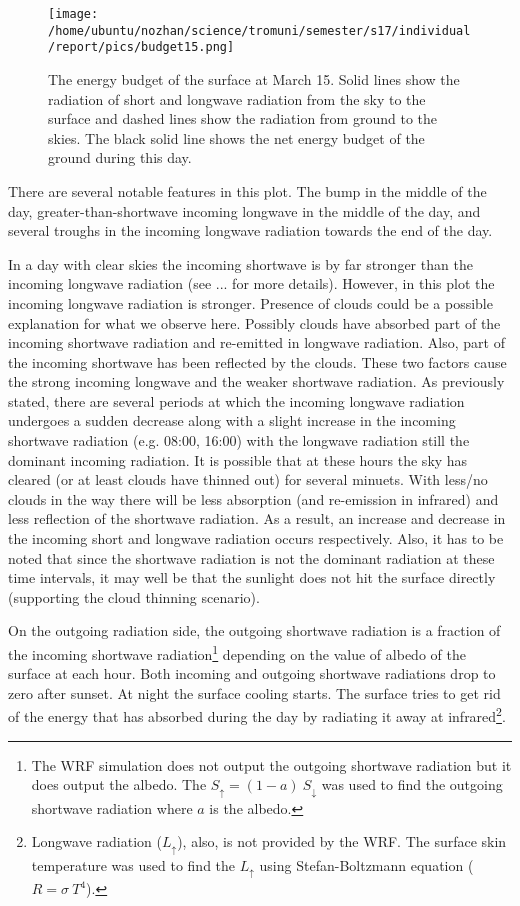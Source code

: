\documentclass[a4paper,12pt]{article}
\numberwithin{equation}{section} %
\begin{document}
\vspace{0.35cm}

\begin{figure}[bhp]
\texttt{[image: /home/ubuntu/nozhan/science/tromuni/semester/s17/individual/report/pics/budget15.png]}
\caption{The energy budget of the surface at March 15. Solid lines show the radiation of short and longwave radiation from the sky to the surface and dashed lines show the radiation from ground to the skies. The black solid line shows the net energy budget of the ground during this day.}
\label{budget15}
\end{figure}

\vspace{1cm}

There are several notable features in this plot. The bump in the middle of the day, greater-than-shortwave incoming longwave in the middle of the day, and several troughs in the incoming longwave radiation towards the end of the day.

In a day with clear skies the incoming shortwave is by far stronger than the incoming longwave radiation (see ... for more details). However, in this plot the incoming longwave radiation is stronger. Presence of clouds could be a possible explanation for what we observe here. Possibly clouds have absorbed part of the incoming shortwave radiation and re-emitted in longwave radiation. Also, part of the incoming shortwave has been reflected by the clouds. These two factors cause the strong incoming longwave and the weaker shortwave radiation. As previously stated, there are several periods at which the incoming longwave radiation undergoes a sudden decrease along with a slight increase in the incoming shortwave radiation (e.g. 08:00, 16:00) with the longwave radiation still the dominant incoming radiation. It is possible that at these hours the sky has cleared (or at least clouds have thinned out) for several minuets. With less/no clouds in the way there will be less absorption (and re-emission in infrared) and less reflection of the shortwave radiation. As a result, an increase and decrease in the incoming short and longwave radiation occurs respectively. Also, it has to be noted that since the shortwave radiation is not the dominant radiation at these time intervals, it may well be that the sunlight does not hit the surface directly (supporting the cloud thinning scenario).

On the outgoing radiation side, the outgoing shortwave radiation is a fraction of the incoming shortwave radiation\footnote{The WRF simulation does not output the outgoing shortwave radiation but it does output the albedo. The $S_{\uparrow} = (1 - a)\: S_{\downarrow}$ was used to find the outgoing shortwave radiation where $a$ is the albedo.} depending on the value of albedo of the surface at each hour. Both incoming and outgoing shortwave radiations drop to zero after sunset. At night the surface cooling starts. The surface tries to get rid of the energy that has absorbed during the day by radiating it away at infrared\footnote{Longwave radiation ($L_{\uparrow}$), also, is not provided by the WRF. The surface skin temperature was used to find the $L_{\uparrow}$ using Stefan-Boltzmann equation ($R = \sigma \: T^4$).}. 
\end{document}
